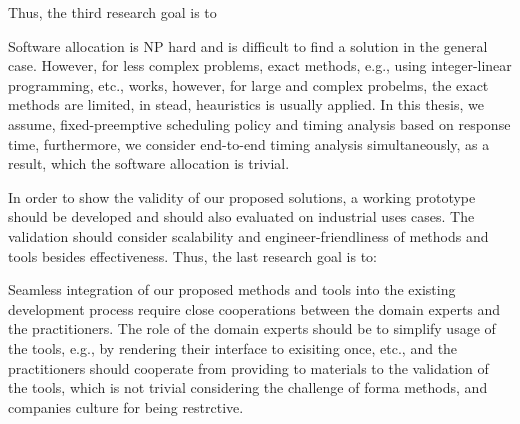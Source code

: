 Thus, the third research goal is to
\begin{researchgoal}
\end{researchgoal}

Software allocation is NP hard and is difficult to find a solution in the general case. However, for less complex problems, exact methods, e.g., using integer-linear programming, etc., works, however, for large and complex probelms, the exact methods are limited, in stead, heauristics is usually applied. In this thesis, we assume, fixed-preemptive scheduling policy and timing analysis based on response time, furthermore, we consider end-to-end timing analysis simultaneously, as a result, which the software allocation is trivial. 

In order to show the validity of our proposed solutions, a working prototype should be developed and should also evaluated on industrial uses cases. The validation should consider scalability and engineer-friendliness of methods and tools besides effectiveness. Thus, the last research goal is to:
\begin{researchgoal}
\end{researchgoal}

Seamless integration of our proposed methods and tools into the existing development process require close cooperations between the domain experts and the practitioners. The role of the domain experts should be to simplify usage of the tools, e.g., by rendering their interface to exisiting once, etc., and the practitioners should cooperate from providing to materials to the validation of the tools, which is not trivial considering the challenge of forma methods, and companies culture for being restrctive.
